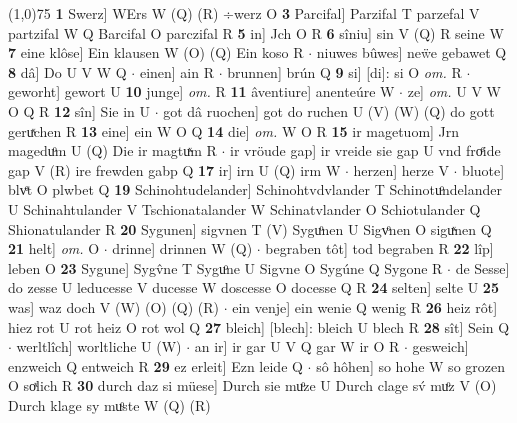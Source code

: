 \documentclass[8pt,a4paper,notitlepage]{article}
\begin{document}
\begin{table}[ht]
\begin{minipage}[t]{0.5\linewidth}
\line(1,0){75} \newline
\textbf{1} Swerz] WErs W (Q) (R) ÷werz O \textbf{3} Parcifal] Parzifal T parzefal V partzifal W Q Barcifal O parczifal R \textbf{5} in] Jch O R \textbf{6} sîniu] sin V (Q) R seine W \textbf{7} eine klôse] Ein klausen W (O) (Q) Ein koso R  $\cdot$ niuwes bûwes] neẅe gebawet Q \textbf{8} dâ] Do U V W Q  $\cdot$ einen] ain R  $\cdot$ brunnen] brún Q \textbf{9} si] [di]: si O \textit{om.} R  $\cdot$ geworht] gewort U \textbf{10} junge] \textit{om.} R \textbf{11} âventiure] anenteúre W  $\cdot$ ze] \textit{om.} U V W O Q R \textbf{12} sîn] Sie in U  $\cdot$ got dâ ruochen] got do ruchen U (V) (W) (Q) do gott geruͯchen R \textbf{13} eine] ein W O Q \textbf{14} die] \textit{om.} W O R \textbf{15} ir magetuom] Jrn mageduͦm U (Q) Die ir magtuͯm R  $\cdot$ ir vröude gap] ir vreide sie gap U vnd froͤide gap V (R) ire frewden gabp Q \textbf{17} ir] irn U (Q) irm W  $\cdot$ herzen] herze V  $\cdot$ bluote] blvͤt O plwbet Q \textbf{19} Schinohtudelander] Schinohtvdvlander T Schinotuͦndelander U Schinahtulander V Tschionatalander W Schinatvlander O Schiotulander Q Shionatulander R \textbf{20} Sygunen] sigvnen T (V) Syguͦnen U Sigvͦnen O siguͯnen Q \textbf{21} helt] \textit{om.} O  $\cdot$ drinne] drinnen W (Q)  $\cdot$ begraben tôt] tod begraben R \textbf{22} lîp] leben O \textbf{23} Sygune] Sygv̂ne T Syguͦne U Sigvne O Sygúne Q Sygone R  $\cdot$ de Sesse] do zesse U leducesse V ducesse W doscesse O docesse Q R \textbf{24} selten] selte U \textbf{25} was] waz doch V (W) (O) (Q) (R)  $\cdot$ ein venje] ein wenie Q wenig R \textbf{26} heiz rôt] hiez rot U rot heiz O rot wol Q \textbf{27} bleich] [blech]: bleich U blech R \textbf{28} sît] Sein Q  $\cdot$ werltlîch] worltliche U (W)  $\cdot$ an ir] ir gar U V Q gar W ir O R  $\cdot$ gesweich] enzweich Q entweich R \textbf{29} ez erleit] Ezn leide Q  $\cdot$ sô hôhen] so hohe W so grozen O soͯlich R \textbf{30} durch daz si müese] Durch sie muͦze U Durch clage sv́ muͦz V (O) Durch klage sy muͦste W (Q) (R) \newline
\end{minipage}
\end{table}
\end{document}
